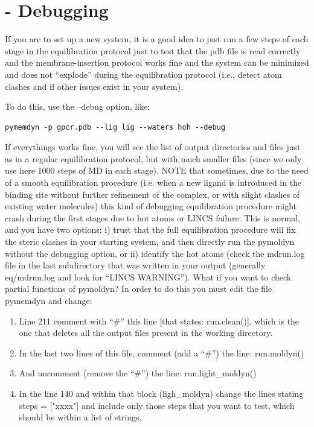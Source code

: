 \documentclass[10pt, oneside, pdftex]{article}
\begin{document}
\section*{ - Debugging} 
If you are to set up a new system, it is a good idea to just run a few
steps of  each stage in the  equilibration protocol just to  test that
the pdb  file is  read correctly  and the  membrane-insertion protocol
works fine  and the system can  be minimized and does  not ``explode''
during the equilibration protocol (i.e., detect atom clashes and if other 
issues exist in your system).

To do this, use the --debug option, like:
\begin{Verbatim}
pymemdyn -p gpcr.pdb --lig lig --waters hoh --debug
\end{Verbatim}

If everythings works fine, you will see the list of output directories
and files just  as in a regular equilibration  protocol, but with much
smaller files (since we only use here 1000 steps of MD in each stage).
NOTE  that  sometimes, due  to  the  need  of a  smooth  equilibration
procedure (i.e.  when a new ligand  is introduced in  the binding site
without further refinement  of the complex, or with  slight clashes of
existing  water  molecules)   this  kind  of  debugging  equilibration
procedure  might crash during  the first  stages due  to hot  atoms or
LINCS failure. This is normal, and you have two options: i) trust that
the full equilibration  procedure will fix the steric  clashes in your
starting  system,  and then  directly  run  the  pymoldyn without  the
debugging option, or  ii) identify the hot atoms  (check the mdrun.log
file  in  the  last  subdirectory  that was  written  in  your  output
(generally eq/mdrun.log  and look for  ``LINCS WARNING'').  What  if you
want to check partial functions of  pymoldyn?  In order to do this you
must edit  the file pymemdyn  and change: 
\begin{enumerate}
\item{Line 211 comment  with ``\#''
this line  [that states: run.clean()],  which is the one  that deletes
all the output files present in the working directory.}
\item{In the  last two  lines of  this file, comment  (add a ``\#'') the
  line: run.moldyn()}
\item{And uncomment (remove the ``\#'') the line: run.light\_moldyn()}
\item{In the line  140 and within that block  (ligh\_moldyn) change the
  lines stating steps = ["xxxx"] and include only those steps that you
  want to test, which should be within a list of strings.}
\end{enumerate}
\end{document}
